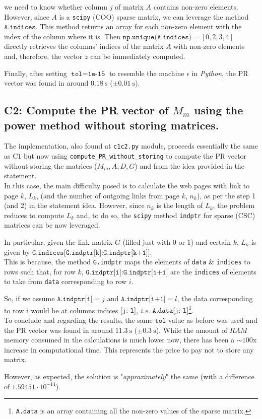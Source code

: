 \documentclass[12pt]{scrartcl}
\begin{document}
we need to know whether column $j$ of matrix $A$ contains non-zero elements. However, since $A$ is a \texttt{scipy} (COO) sparse matrix, we can leverage the  method $\texttt{A.indices}$. This method returns an array for each non-zero element with the index of the column where it is. Then $\texttt{np.unique(A.indices)}=[0,2,3,4]$ directly retrieves the columns' indices of the matrix $A$ with non-zero elements and, therefore, the vector $z$ can be immediately computed.

Finally, after setting $\texttt{tol} = \texttt{1e-15}$ to resemble the machine $\epsilon$ in \textit{Python}, the PR vector was found in around $0.18\ \mathrm{s}$ ($\pm 0.01\ \mathrm{s}$).


\subsection*{C2: Compute the PR vector of $M_m$ using the power method without storing matrices.}

The implementation, also found at \texttt{c1c2.py} module, proceeds essentially the same as C1 but now using \texttt{compute\_{}PR\_{}without\_{}storing} to compute the PR vector without storing the matrices ($M_m, A, D, G$) and from the idea provided in the statement.\\

In this case, the main difficulty posed is to calculate the web pages with link to page $k$, $L_k$, (and the number of outgoing links from page $k$, $n_k$), as per the step 1 (and 2) in the statement idea. However, since $n_k$ is the length of $L_k$, the problem reduces to compute $L_k$ and, to do so, the \texttt{scipy} method \texttt{indptr} for sparse (CSC) matrices can be now leveraged. 

In particular, given the link matrix $G$ (filled just with 0 or 1) and certain $k$, $L_k$ is given by $\texttt{G.indices[G.indptr[k]:G.indptr[k+1]]}$.\\ 

This is because, the method \texttt{G.indptr} maps the elements of \texttt{data} \& \texttt{indices} to rows such that, for row $k$, $\texttt{G.indptr[i]:G.indptr[i+1]}$ are the \texttt{indices} of elements to take from \texttt{data} corresponding to row $i$. 

So, if we assume $\texttt{A.indptr[i]}=j$ and $\texttt{A.indptr[i+1]}=l$, the data corresponding to row $i$ would be at columns indices $\texttt{[j: l]}$, \textit{i.e. }$\texttt{A.data[j: l]}$\footnote{\texttt{A.data} is an array containing all the non-zero values of the sparse matrix.}.\\ 

To conclude and regarding the results, the same $\texttt{tol}$ value as before was used and the PR vector was found in around $11.3\ \mathrm{s}$ ($\pm 0.3\ \mathrm{s}$). While the amount of $RAM$ memory consumed in the calculations is much lower now, there has been a $\sim 100\mathrm{x}$ increase in computational time. This represents the price to pay not to store any matrix.

However, as expected, the solution is "\textit{approximately}" the same (with a difference of $1.59451\cdot 10^{-14}$).
 
\end{document}
